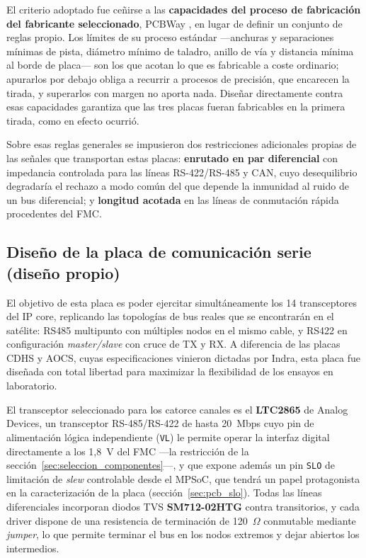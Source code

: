 El criterio adoptado fue ceñirse a las \textbf{capacidades del proceso de fabricación del fabricante
seleccionado}, PCBWay \cite{pcbway_caps}, en lugar de definir un conjunto de reglas propio. Los
límites de su proceso estándar ---anchuras y separaciones mínimas de pista, diámetro mínimo de
taladro, anillo de vía y distancia mínima al borde de placa--- son los que acotan lo que es
fabricable a coste ordinario; apurarlos por debajo obliga a recurrir a procesos de precisión, que
encarecen la tirada, y superarlos con margen no aporta nada. Diseñar directamente contra esas
capacidades garantiza que las tres placas fueran fabricables en la primera tirada, como en efecto
ocurrió.

Sobre esas reglas generales se impusieron dos restricciones adicionales propias de las señales que
transportan estas placas: \textbf{enrutado en par diferencial} con impedancia controlada para las
líneas RS-422/RS-485 y CAN, cuyo desequilibrio degradaría el rechazo a modo común del que depende
la inmunidad al ruido de un bus diferencial; y \textbf{longitud acotada} en las líneas de
conmutación rápida procedentes del FMC.

\subsection{Diseño de la placa de comunicación serie (diseño propio)}

El objetivo de esta placa es poder ejercitar simultáneamente los 14 transceptores del IP core,
replicando las topologías de bus reales que se encontrarán en el satélite: RS485 multipunto
con múltiples nodos en el mismo cable, y RS422 en configuración \textit{master/slave} con cruce de
TX y RX. A diferencia de las placas CDHS y AOCS, cuyas especificaciones vinieron dictadas
por Indra, esta placa fue diseñada con total libertad para maximizar la flexibilidad de los
ensayos en laboratorio.

El transceptor seleccionado para los catorce canales es el \textbf{LTC2865} \cite{ltc2865} de
Analog Devices, un transceptor RS-485/RS-422 de hasta 20~Mbps cuyo pin de alimentación lógica
independiente (\texttt{VL}) le permite operar la interfaz digital directamente a los 1,8~V del
FMC ---la restricción de la sección~\ref{sec:seleccion_componentes}---, y que expone además un
pin \texttt{SLO} de limitación de \textit{slew} controlable desde el MPSoC, que tendrá un papel
protagonista en la caracterización de la placa (sección~\ref{sec:pcb_slo}). Todas las líneas
diferenciales incorporan diodos TVS \textbf{SM712-02HTG} contra transitorios, y cada driver
dispone de una resistencia de terminación de 120~$\Omega$ conmutable mediante \textit{jumper},
lo que permite terminar el bus en los nodos extremos y dejar abiertos los intermedios.

